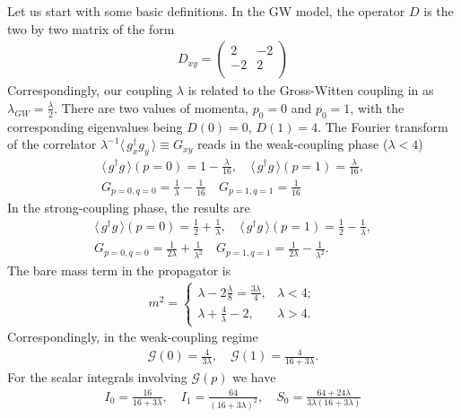\documentclass[twocolumn,showpacs,preprintnumbers,superscriptaddress,amsmath,floatfix,amssymb,secnumarabic]{revtex4}
\newcommand{\lr}[1]{ \left( #1 \right) }
\newcommand{\vev}[1]{ \langle \, #1 \, \rangle }
\begin{document}
Let us start with some basic definitions. In the GW model, the operator $D$ is the two by two matrix of the form
\begin{eqnarray}
\label{GW_D_operator}
 D_{xy} = \left(
   \begin{array}{cc}
     2 & -2 \\
     -2 & 2 \\
   \end{array}
 \right)
\end{eqnarray}
Correspondingly, our coupling $\lambda$ is related to the Gross-Witten coupling in \cite{Gross:80:1} as $\lambda_{GW} = \frac{\lambda}{2}$. There are two values of momenta, $p_0 = 0$ and $p_0 = 1$, with the corresponding eigenvalues being $D\lr{0} = 0$, $D\lr{1} = 4$. The Fourier transform of the correlator $\lambda^{-1} \vev{g^{\dag}_x g_y} \equiv G_{x y}$ reads in the weak-coupling phase ($\lambda < 4$)
\begin{eqnarray}
\label{fouriers_wc}
 \vev{g^{\dag} g}\lr{p = 0} = 1 - \frac{\lambda}{16},
 \quad
 \vev{g^{\dag} g}\lr{p = 1} = \frac{\lambda}{16},
 \nonumber \\
 G_{p=0, q=0} = \frac{1}{\lambda} - \frac{1}{16}
 \quad
 G_{p=1, q=1} = \frac{1}{16}
\end{eqnarray}
In the strong-coupling phase, the results are
\begin{eqnarray}
\label{fouriers_sc}
 \vev{g^{\dag} g}\lr{p = 0} = \frac{1}{2} + \frac{1}{\lambda},
 \quad
 \vev{g^{\dag} g}\lr{p = 1} = \frac{1}{2} - \frac{1}{\lambda},
 \nonumber \\
 G_{p=0, q=0} = \frac{1}{2 \lambda} + \frac{1}{\lambda^2}
 \quad
 G_{p=1, q=1} = \frac{1}{2 \lambda} - \frac{1}{\lambda^2} .
\end{eqnarray}
The bare mass term in the propagator is
\begin{eqnarray}
\label{bare_mass}
 m^2 = \left\{
         \begin{array}{ll}
           \lambda - 2 \frac{\lambda}{8} = \frac{3 \lambda}{4}, & \lambda < 4; \\
           \lambda + \frac{4}{\lambda} - 2, & \lambda > 4.
         \end{array}
       \right.
\end{eqnarray}
Correspondingly, in the weak-coupling regime
\begin{eqnarray}
\label{modified_propagator}
 \mathcal{G}\lr{0} = \frac{4}{3 \lambda}, \quad
 \mathcal{G}\lr{1} = \frac{4}{16 + 3 \lambda} .
\end{eqnarray}
For the scalar integrals involving $\mathcal{G}\lr{p}$ we have
\begin{eqnarray}
\label{scalar_ints_GW}
 I_0 = \frac{16}{16 + 3 \lambda},
 \quad
 I_1 = \frac{64}{\lr{16 + 3 \lambda}^2},
 \quad
 S_0 = \frac{64 + 24 \lambda}{3 \lambda \lr{16 + 3 \lambda}}
\end{eqnarray}
\end{document}
